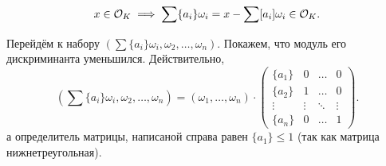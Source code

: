 \begin{homework}
			\[
				x \in \mathcal{O}_{K} \implies \sum \{ a_i \}\omega_{i} = x - \sum [a_i] \omega_i \in \mathcal{O}_{K}.
			\]

			Перейдём к набору $(\sum \{ a_i \}\omega_{i}, \omega_{2}, \ldots, \omega_{n})$. Покажем, что модуль его дискриминанта уменьшился. Действительно, 
			\[
				(\sum \{ a_i \}\omega_{i}, \omega_{2}, \ldots, \omega_{n}) = (\omega_{1}, \ldots, \omega_{n}) \cdot \begin{pmatrix} \{ a_{1}\} & 0 & \ldots & 0 \\ \{ a_{2}\} & 1 & \ldots & 0 \\ \vdots & \vdots & \ddots & \vdots \\ \{ a_n\} & 0 & \ldots & 1 \end{pmatrix}.
			\]
			а определитель матрицы, написаной справа равен $\{ a_1 \} \le 1$ (так как матрица нижнетреугольная).
		\end{homework}

